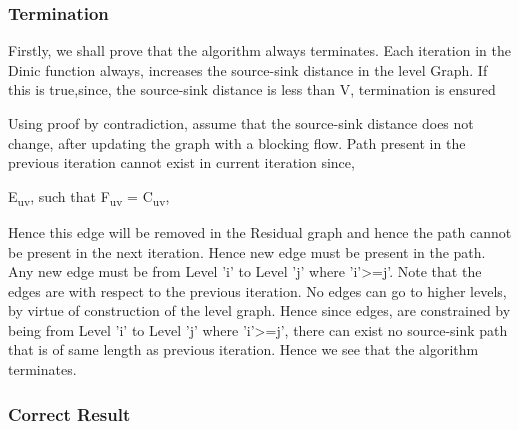 \documentclass[paper=a4, fontsize=11pt]{scrartcl} %
\numberwithin{equation}{section} %
\numberwithin{figure}{section} %
\numberwithin{table}{section} %
\begin{document}
\subsubsection{Termination}
Firstly, we shall prove that the algorithm always terminates. Each iteration in the Dinic function always, increases the source-sink distance in the level Graph. If this is true,since, the source-sink distance is less than V, termination is ensured

Using proof by contradiction, assume that the source-sink distance does not change, after updating the graph with a blocking flow. Path present in the previous iteration cannot exist in current iteration since, 

\vspace{5mm} 
\exists E\textsubscript{uv}, such that F\textsubscript{uv} = C\textsubscript{uv}, 

\vspace{5mm} 

Hence this edge will be removed in the Residual graph and hence the path cannot be present in the next iteration.
Hence new edge must be present in the path. Any new edge must be from Level 'i' to Level 'j' where 'i'>=j'. Note that the edges are with respect to the previous iteration. No edges can go to higher levels, by virtue of construction of the level graph. Hence since edges, are constrained by being from Level 'i' to Level 'j' where 'i'>=j', there can exist no source-sink path that is of same length as previous iteration. Hence we see that the algorithm terminates.


\subsubsection{Correct Result}





\end{document}
